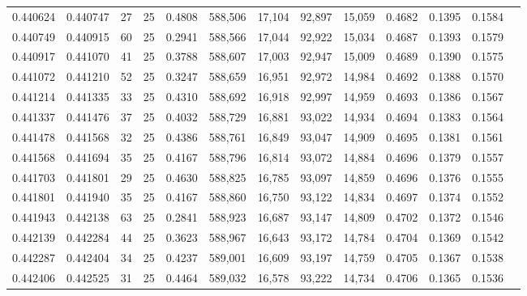 \begin{tabular}{rrrrrrrrrrrrr}
0.440624 & 0.440747 &    27 &  25 &                                     0.4808 & 588,506 &  17,104 &  92,897 &  15,059 & 0.4682 & 0.1395 & 0.1584 \\
0.440749 & 0.440915 &    60 &  25 &                                     0.2941 & 588,566 &  17,044 &  92,922 &  15,034 & 0.4687 & 0.1393 & 0.1579 \\
0.440917 & 0.441070 &    41 &  25 &                                     0.3788 & 588,607 &  17,003 &  92,947 &  15,009 & 0.4689 & 0.1390 & 0.1575 \\
0.441072 & 0.441210 &    52 &  25 &                                     0.3247 & 588,659 &  16,951 &  92,972 &  14,984 & 0.4692 & 0.1388 & 0.1570 \\
0.441214 & 0.441335 &    33 &  25 &                                     0.4310 & 588,692 &  16,918 &  92,997 &  14,959 & 0.4693 & 0.1386 & 0.1567 \\
0.441337 & 0.441476 &    37 &  25 &                                     0.4032 & 588,729 &  16,881 &  93,022 &  14,934 & 0.4694 & 0.1383 & 0.1564 \\
0.441478 & 0.441568 &    32 &  25 &                                     0.4386 & 588,761 &  16,849 &  93,047 &  14,909 & 0.4695 & 0.1381 & 0.1561 \\
0.441568 & 0.441694 &    35 &  25 &                                     0.4167 & 588,796 &  16,814 &  93,072 &  14,884 & 0.4696 & 0.1379 & 0.1557 \\
0.441703 & 0.441801 &    29 &  25 &                                     0.4630 & 588,825 &  16,785 &  93,097 &  14,859 & 0.4696 & 0.1376 & 0.1555 \\
0.441801 & 0.441940 &    35 &  25 &                                     0.4167 & 588,860 &  16,750 &  93,122 &  14,834 & 0.4697 & 0.1374 & 0.1552 \\
0.441943 & 0.442138 &    63 &  25 &                                     0.2841 & 588,923 &  16,687 &  93,147 &  14,809 & 0.4702 & 0.1372 & 0.1546 \\
0.442139 & 0.442284 &    44 &  25 &                                     0.3623 & 588,967 &  16,643 &  93,172 &  14,784 & 0.4704 & 0.1369 & 0.1542 \\
0.442287 & 0.442404 &    34 &  25 &                                     0.4237 & 589,001 &  16,609 &  93,197 &  14,759 & 0.4705 & 0.1367 & 0.1538 \\
0.442406 & 0.442525 &    31 &  25 &                                     0.4464 & 589,032 &  16,578 &  93,222 &  14,734 & 0.4706 & 0.1365 & 0.1536 \\

\end{tabular}
